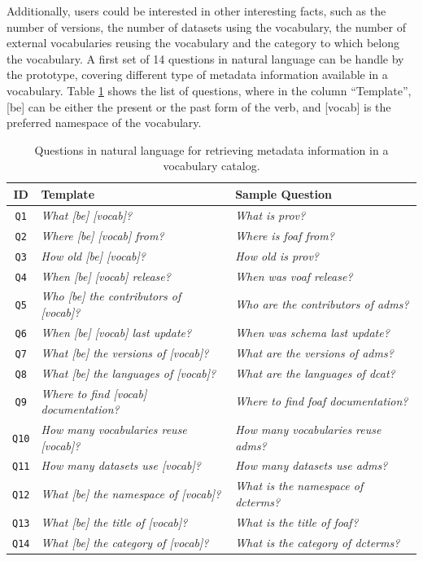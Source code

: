 \documentclass{acm}
\begin{document}
Additionally, users could be interested in other interesting facts, such as the number of versions, the number of datasets  using the vocabulary, the number of external vocabularies reusing the vocabulary and the category to which belong the vocabulary. A first set of 14 questions in natural language can be handle by the prototype, covering different type of metadata information available in a vocabulary. Table \ref{tab:qtable} shows the list of questions, where in the column ``Template'', [be] can be either the present or the past form of the verb, and [vocab] is the preferred namespace of the vocabulary.    

\begin{table}
\centering
\caption{Questions in natural language for retrieving metadata information in a vocabulary catalog. }
\label{tab:qtable}
\begin{tabular}{|c|l|l|} \hline
\textbf{ID} & \textbf{Template} & \textbf{Sample Question}\\ \hline
\texttt{Q1} & \textit{What [be] [vocab]?} &  \textit{What is prov?} \\ \hline
\texttt{Q2} & \textit{Where [be] [vocab] from?} &  \textit{Where is foaf from?} \\ \hline
\texttt{Q3} & \textit{How old [be] [vocab]?} &  \textit{How old is prov?} \\ \hline
\texttt{Q4} & \textit{When [be] [vocab] release?} &  \textit{When was voaf release?} \\ \hline
\texttt{Q5} & \textit{Who [be] the contributors of [vocab]?} &  \textit{Who are the contributors of adms?} \\ \hline
\texttt{Q6} & \textit{When [be] [vocab] last update?} &  \textit{When was schema last update?} \\ \hline
\texttt{Q7} & \textit{What [be] the versions of [vocab]?} &  \textit{What are the versions of adms?} \\ \hline
\texttt{Q8} & \textit{What [be] the languages of [vocab]?} &  \textit{What are the languages of dcat?} \\ \hline
\texttt{Q9} & \textit{Where to find [vocab] documentation?} &  \textit{Where to find foaf documentation?} \\ \hline
\texttt{Q10} & \textit{How many vocabularies reuse [vocab]?} &  \textit{How many vocabularies reuse adms?} \\ \hline
\texttt{Q11} & \textit{How many datasets use [vocab]?} &  \textit{How many datasets use adms?} \\ \hline
\texttt{Q12} & \textit{What [be] the namespace of [vocab]?} &  \textit{What is the namespace of  dcterms?} \\ \hline
\texttt{Q13} & \textit{What [be] the title of [vocab]?} &  \textit{What is the title of foaf?} \\ \hline
\texttt{Q14} & \textit{What [be] the category of [vocab]?} &  \textit{What is the category of dcterms?} \\ \hline
\end{tabular}
\end{table}
\end{document}
